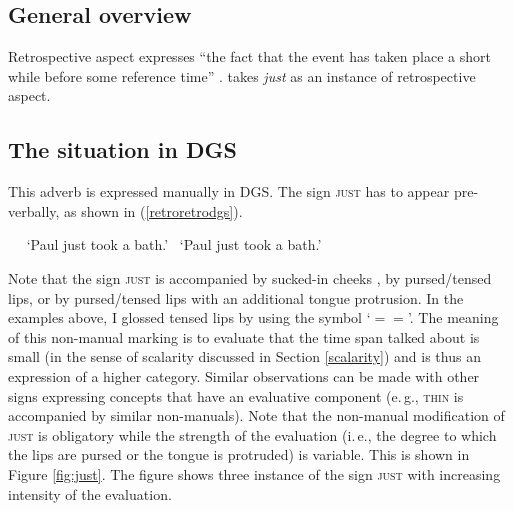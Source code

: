\subsection{General overview}
Retrospective aspect expresses ``the fact that the event has taken place a short while before some reference time'' \citep[96]{cinque1999adverbs}. \citet{cinque1999adverbs} takes \textit{just} as an instance of retrospective aspect. 

\subsection{The situation in DGS}
This adverb is expressed manually in DGS. The sign \textsc{just} has to appear pre-verbally, as shown in (\ref{retroretrodgs}).


\begin{exe}

\ex\label{retroretrodgs}\begin{xlist} 
\ex \textcolor{white}{*}  
%
\glt \textcolor{white}{*}`Paul just took a bath.' \label{ex:retrospectivea}
\ex *  
%
\glt \textcolor{white}{*}`Paul just took a bath.' \label{ex:retrospectivea}
\end{xlist}
\end{exe} 


\noindent Note that the sign \textsc{just} is accompanied by sucked-in cheeks \citep[40]{herrmann2013modal}, by pursed/tensed lips, or by pursed/tensed lips with an additional tongue protrusion. In the examples above, I glossed tensed lips by using the symbol `$= =$'. The meaning of this non-manual marking is to evaluate that the time span talked about is small (in the sense of scalarity discussed in Section \ref{scalarity}) and is thus an expression of a higher category. Similar observations can be made with other signs expressing concepts that have an evaluative component (e.\,g., \textsc{thin} is accompanied by similar non-manuals). Note that the non-manual modification of \textsc{just} is obligatory while the strength of the evaluation (i.\,e., the degree to which the lips are pursed or the tongue is protruded) is variable. This is shown in Figure \ref{fig:just}. The figure shows three instance of the sign \textsc{just} with increasing intensity of the evaluation. 

